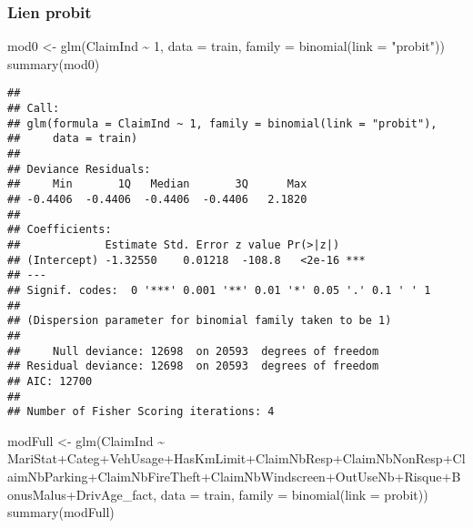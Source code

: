 \documentclass[
]{article}
\newenvironment{Shaded}{\begin{snugshade}}{\end{snugshade}}
\newcommand{\AttributeTok}[1]{\textcolor[rgb]{0.77,0.63,0.00}{#1}}
\newcommand{\DecValTok}[1]{\textcolor[rgb]{0.00,0.00,0.81}{#1}}
\newcommand{\FunctionTok}[1]{\textcolor[rgb]{0.00,0.00,0.00}{#1}}
\newcommand{\NormalTok}[1]{#1}
\newcommand{\OtherTok}[1]{\textcolor[rgb]{0.56,0.35,0.01}{#1}}
\newcommand{\SpecialCharTok}[1]{\textcolor[rgb]{0.00,0.00,0.00}{#1}}
\newcommand{\StringTok}[1]{\textcolor[rgb]{0.31,0.60,0.02}{#1}}
\begin{document}
\hypertarget{lien-probit}{%
\subsubsection{Lien probit}\label{lien-probit}}

\begin{Shaded}
\begin{Highlighting}[]
\NormalTok{mod0 }\OtherTok{\textless{}{-}} \FunctionTok{glm}\NormalTok{(ClaimInd }\SpecialCharTok{\textasciitilde{}} \DecValTok{1}\NormalTok{, }\AttributeTok{data =}\NormalTok{ train, }\AttributeTok{family =} \FunctionTok{binomial}\NormalTok{(}\AttributeTok{link =} \StringTok{"probit"}\NormalTok{))}
\FunctionTok{summary}\NormalTok{(mod0)}
\end{Highlighting}
\end{Shaded}

\begin{verbatim}
## 
## Call:
## glm(formula = ClaimInd ~ 1, family = binomial(link = "probit"), 
##     data = train)
## 
## Deviance Residuals: 
##     Min       1Q   Median       3Q      Max  
## -0.4406  -0.4406  -0.4406  -0.4406   2.1820  
## 
## Coefficients:
##             Estimate Std. Error z value Pr(>|z|)    
## (Intercept) -1.32550    0.01218  -108.8   <2e-16 ***
## ---
## Signif. codes:  0 '***' 0.001 '**' 0.01 '*' 0.05 '.' 0.1 ' ' 1
## 
## (Dispersion parameter for binomial family taken to be 1)
## 
##     Null deviance: 12698  on 20593  degrees of freedom
## Residual deviance: 12698  on 20593  degrees of freedom
## AIC: 12700
## 
## Number of Fisher Scoring iterations: 4
\end{verbatim}

\begin{Shaded}
\begin{Highlighting}[]
\NormalTok{modFull }\OtherTok{\textless{}{-}} \FunctionTok{glm}\NormalTok{(ClaimInd }\SpecialCharTok{\textasciitilde{}}\NormalTok{ MariStat}\SpecialCharTok{+}\NormalTok{Categ}\SpecialCharTok{+}\NormalTok{VehUsage}\SpecialCharTok{+}\NormalTok{HasKmLimit}\SpecialCharTok{+}\NormalTok{ClaimNbResp}\SpecialCharTok{+}\NormalTok{ClaimNbNonResp}\SpecialCharTok{+}\NormalTok{ClaimNbParking}\SpecialCharTok{+}\NormalTok{ClaimNbFireTheft}\SpecialCharTok{+}\NormalTok{ClaimNbWindscreen}\SpecialCharTok{+}\NormalTok{OutUseNb}\SpecialCharTok{+}\NormalTok{Risque}\SpecialCharTok{+}\NormalTok{BonusMalus}\SpecialCharTok{+}\NormalTok{DrivAge\_fact, }\AttributeTok{data =}\NormalTok{ train, }\AttributeTok{family =} \FunctionTok{binomial}\NormalTok{(}\AttributeTok{link =}\NormalTok{ probit))}
\FunctionTok{summary}\NormalTok{(modFull)}
\end{Highlighting}
\end{Shaded}
\end{document}
